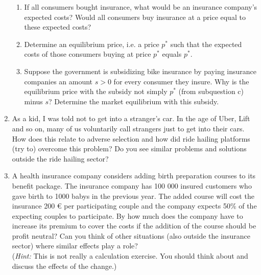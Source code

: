 \documentclass[a4paper,12pt]{article}
\begin{document}
\begin{enumerate}[resume]
\begin{enumerate}
  \item If all consumers bought insurance, what would be an insurance company's expected costs? Would all consumers buy insurance at a price equal to these expected costs?
  \item Determine an equilibrium price, i.e. a price $p^*$ such that the expected costs of those consumers buying at price $p^*$ equals $p^*$.
  \item Suppose the government is subsidizing bike insurance by paying insurance companies an amount $s>0$ for every consumer they insure. Why is the equilibrium price with the subsidy not simply $p^*$ (from subquestion c) minus $s$? Determine the market equilibrium with this subsidy. 
  \end{enumerate}
  \item As a kid, I was told not to get into a stranger's car. In the age of Uber, Lift and so on, many of us voluntarily call strangers just to get into their cars. How does this relate to adverse selection and how did ride hailing platforms (try to) overcome this problem? Do you see similar problems and solutions outside the ride hailing sector?
  \item A health insurance company considers adding birth preparation courses to its benefit package. The insurance company has 100 000 insured customers who gave birth to 1000 babys in the previous year. The added course will cost the insurance 200 € per participating couple and the company expects  50\% of the expecting couples to participate. By how much does the company have to increase its premium to cover the costs if the addition of the course should be profit neutral? Can you think of other situations (also outside the insurance sector) where similar effects play a role?\\
    (\emph{Hint:} This is not really a calculation exercise. You should think about and discuss the effects of the change.)

\end{enumerate}
\end{document}
